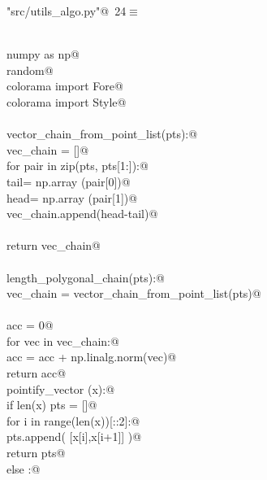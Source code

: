 \documentclass[10pt, english, oneside]{report}
\begin{document}
\begin{appendices}
\begin{flushleft} \small\label{scrap24}\raggedright\small
{} \verb@"src/utils_algo.py"@\nobreak\ {\footnotesize {24}}$\equiv$
\vspace{-1ex}
\begin{list}{}{} \item
\mbox{}\verb@@\\
\mbox{}\verb@import numpy as np@\\
\mbox{}\verb@import random@\\
\mbox{}\verb@from colorama import Fore@\\
\mbox{}\verb@from colorama import Style@\\
\mbox{}\verb@@\\
\mbox{}\verb@def vector_chain_from_point_list(pts):@\\
\mbox{}\verb@    vec_chain = []@\\
\mbox{}\verb@    for pair in zip(pts, pts[1:]):@\\
\mbox{}\verb@        tail= np.array (pair[0])@\\
\mbox{}\verb@        head= np.array (pair[1])@\\
\mbox{}\verb@        vec_chain.append(head-tail)@\\
\mbox{}\verb@@\\
\mbox{}\verb@    return vec_chain@\\
\mbox{}\verb@@\\
\mbox{}\verb@def length_polygonal_chain(pts):@\\
\mbox{}\verb@    vec_chain = vector_chain_from_point_list(pts)@\\
\mbox{}\verb@@\\
\mbox{}\verb@    acc = 0@\\
\mbox{}\verb@    for vec in vec_chain:@\\
\mbox{}\verb@        acc = acc + np.linalg.norm(vec)@\\
\mbox{}\verb@    return acc@\\
\mbox{}\verb@def pointify_vector (x):@\\
\mbox{}\verb@    if len(x) % 2 == 0:@\\
\mbox{}\verb@        pts = []@\\
\mbox{}\verb@        for i in range(len(x))[::2]:@\\
\mbox{}\verb@            pts.append( [x[i],x[i+1]] )@\\
\mbox{}\verb@        return pts@\\
\mbox{}\verb@    else :@\\

\end{list}
\end{flushleft}
\end{appendices}
\end{document}
